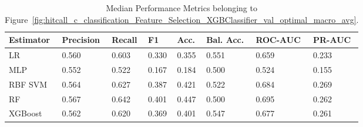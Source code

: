 \begin{longtable}{llllllll}
\caption{Median Performance Metrics belonging to Figure~\ref{fig:hitcall_c_classification_Feature_Selection_XGBClassifier_val_optimal_macro_avg}.}\label{tab:table:hitcall_c_classification_feature_selection_xgbclassifier_val_optimal_macro_avg}\\
\toprule
\midrule
\small Estimator & \small Precision & \small Recall & \small F1 & \small Acc. & \small Bal. Acc. & \small ROC-AUC & \small PR-AUC\\
\hline
LR & 0.560 & 0.603 & 0.330 & 0.355 & 0.551 & 0.659 & 0.233\\
MLP & 0.552 & 0.522 & 0.167 & 0.184 & 0.500 & 0.524 & 0.155\\
RBF SVM & 0.564 & 0.627 & 0.387 & 0.421 & 0.522 & 0.684 & 0.269\\
RF & 0.567 & 0.642 & 0.401 & 0.447 & 0.500 & 0.695 & 0.262\\
XGBoost & 0.562 & 0.620 & 0.369 & 0.401 & 0.547 & 0.677 & 0.261\\
\bottomrule
\end{longtable}